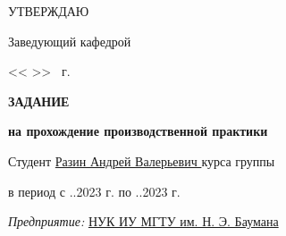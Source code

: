 \documentclass[a4paper,14pt,unknownkeysallowed]{extreport}
\begin{document}
\fontsize{11pt}{11pt}\selectfont
\begin{flushright}
    \begin{minipage}{0.4\textwidth}\raggedleft

        УТВЕРЖДАЮ \hspace{2.5cm}

        Заведующий кафедрой~

        \vspace{0.3cm}

        \ulinetext{}{} 

        \vspace{0.3cm}

        << \ulinetext[1cm]{}{} >> \ulinetext{}{} \the\year \ г.
    \end{minipage}
\end{flushright}

\begin{center}\linespread{1}\selectfont
    \Large{\textbf{ЗАДАНИЕ}}

    \large{\textbf{на прохождение производственной практики}}

    \large{}
\end{center}

\fontsize{14pt}{14pt}\selectfont

\noindent Студент \uline{\hfill Разин Андрей Валерьевич \hfill}  курса группы 

\vspace{0.3cm}

\noindent в период с ..2023 г. по ..2023 г.

\vspace{0.3cm}

\noindent \textit{Предприятие:} \uline{\hfill НУК ИУ МГТУ им. Н. Э. Баумана \hfill}

\vspace{0.3cm}



\end{document}
